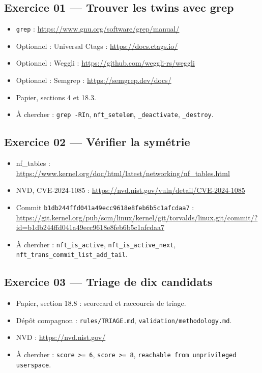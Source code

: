 \documentclass{training}
\begin{document}
\subsection*{Exercice 01 --- Trouver les twins avec grep}
\begin{itemize}
  \item \texttt{grep} : \url{https://www.gnu.org/software/grep/manual/}
  \item Optionnel : Universal Ctags : \url{https://docs.ctags.io/}
  \item Optionnel : Weggli : \url{https://github.com/weggli-rs/weggli}
  \item Optionnel : Semgrep : \url{https://semgrep.dev/docs/}
  \item Papier, sections 4 et 18.3.
  \item À chercher : \texttt{grep -RIn}, \texttt{nft\_setelem},
        \texttt{\_deactivate}, \texttt{\_destroy}.
\end{itemize}

\subsection*{Exercice 02 --- Vérifier la symétrie}
\begin{itemize}
  \item nf\_tables :
        \url{https://www.kernel.org/doc/html/latest/networking/nf_tables.html}
  \item NVD, CVE-2024-1085 :
        \url{https://nvd.nist.gov/vuln/detail/CVE-2024-1085}
  \item Commit \texttt{b1db244ffd041a49ecc9618e8feb6b5c1afcdaa7} :
        \url{https://git.kernel.org/pub/scm/linux/kernel/git/torvalds/linux.git/commit/?id=b1db244ffd041a49ecc9618e8feb6b5c1afcdaa7}
  \item À chercher : \texttt{nft\_is\_active}, \texttt{nft\_is\_active\_next},
        \texttt{nft\_trans\_commit\_list\_add\_tail}.
\end{itemize}

\subsection*{Exercice 03 --- Triage de dix candidats}
\begin{itemize}
  \item Papier, section 18.8 : scorecard et raccourcis de triage.
  \item Dépôt compagnon : \texttt{rules/TRIAGE.md},
        \texttt{validation/methodology.md}.
  \item NVD : \url{https://nvd.nist.gov/}
  \item À chercher : \texttt{score >= 6}, \texttt{score >= 8},
        \texttt{reachable from unprivileged userspace}.
\end{itemize}
\end{document}
